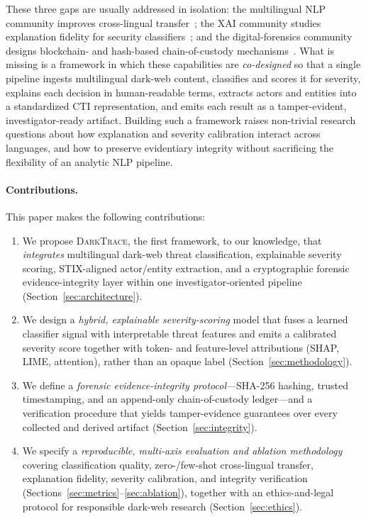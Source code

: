 \documentclass[11pt,a4paper]{article}
\newcommand{\framework}{\textsc{DarkTrace}}
\begin{document}
These three gaps are usually addressed in isolation: the multilingual NLP community
improves cross-lingual transfer~\cite{thangaraj2024crosslingual,conneau2020xlmr}; the
XAI community studies explanation fidelity for security
classifiers~\cite{gaspar2024xai,salih2023perspective,kalakoti2025evaluating}; and the
digital-forensics community designs blockchain- and hash-based chain-of-custody
mechanisms~\cite{lone2019forensicchain,ali2022procedure,pontecuevas2025blockchain}.
What is missing is a framework in which these capabilities are \emph{co-designed} so
that a single pipeline ingests multilingual dark-web content, classifies and scores it
for severity, explains each decision in human-readable terms, extracts actors and
entities into a standardized CTI representation, and emits each result as a
tamper-evident, investigator-ready artifact. Building such a framework raises
non-trivial research questions about how explanation and severity calibration interact
across languages, and how to preserve evidentiary integrity without sacrificing the
flexibility of an analytic NLP pipeline.

\paragraph{Contributions.} This paper makes the following contributions:
\begin{enumerate}[leftmargin=1.4em]
  \item We propose \framework{}, the first framework, to our knowledge, that
  \emph{integrates} multilingual dark-web threat classification, explainable severity
  scoring, STIX-aligned actor/entity extraction, and a cryptographic forensic
  evidence-integrity layer within one investigator-oriented pipeline
  (Section~\ref{sec:architecture}).
  \item We design a \emph{hybrid, explainable severity-scoring} model that fuses a
  learned classifier signal with interpretable threat features and emits a calibrated
  severity score together with token- and feature-level attributions (SHAP, LIME,
  attention), rather than an opaque label (Section~\ref{sec:methodology}).
  \item We define a \emph{forensic evidence-integrity protocol}---SHA-256 hashing,
  trusted timestamping, and an append-only chain-of-custody ledger---and a verification
  procedure that yields tamper-evidence guarantees over every collected and derived
  artifact (Section~\ref{sec:integrity}).
  \item We specify a \emph{reproducible, multi-axis evaluation and ablation
  methodology} covering classification quality, zero-/few-shot cross-lingual transfer,
  explanation fidelity, severity calibration, and integrity verification
  (Sections~\ref{sec:metrics}--\ref{sec:ablation}), together with an ethics-and-legal
  protocol for responsible dark-web research (Section~\ref{sec:ethics}).
\end{enumerate}
\end{document}
